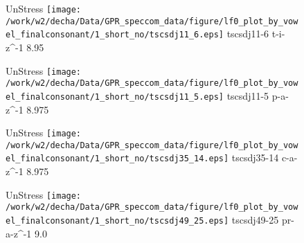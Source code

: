 \documentclass{article}
\begin{document}
\begin{figure}[t]
\begin{minipage}[b]{.24\textwidth}
UnStress
\centering
\texttt{[image: /work/w2/decha/Data/GPR\_speccom\_data/figure/lf0\_plot\_by\_vowel\_finalconsonant/1\_short\_no/tscsdj11\_6.eps]}
tscsdj11-6 t-i-z\textasciicircum-1 8.95
\end{minipage}
\begin{minipage}[b]{.24\textwidth}
UnStress
\centering
\texttt{[image: /work/w2/decha/Data/GPR\_speccom\_data/figure/lf0\_plot\_by\_vowel\_finalconsonant/1\_short\_no/tscsdj11\_5.eps]}
tscsdj11-5 p-a-z\textasciicircum-1 8.975
\end{minipage}
\begin{minipage}[b]{.24\textwidth}
UnStress
\centering
\texttt{[image: /work/w2/decha/Data/GPR\_speccom\_data/figure/lf0\_plot\_by\_vowel\_finalconsonant/1\_short\_no/tscsdj35\_14.eps]}
tscsdj35-14 c-a-z\textasciicircum-1 8.975
\end{minipage}
\begin{minipage}[b]{.24\textwidth}
UnStress
\centering
\texttt{[image: /work/w2/decha/Data/GPR\_speccom\_data/figure/lf0\_plot\_by\_vowel\_finalconsonant/1\_short\_no/tscsdj49\_25.eps]}
tscsdj49-25 pr-a-z\textasciicircum-1 9.0
\end{minipage}
\end{figure}
\end{document}
